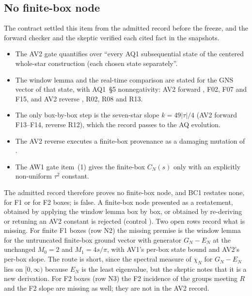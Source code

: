 \subsection{No finite-box node}
\label{sec:bc1-no-node}
The contract settled this item from the admitted record before the freeze,
and the forward checker and the skeptic verified each cited fact in the
snapshots.
\begin{itemize}
\item The AV2 gate quantifies over ``every AQ1 subsequential state of the
 centered whole-star construction (each chosen state separately''.
\item The window lemma and the real-time comparison are stated for the GNS
 vector of that state, with AQ1~\S5 nonnegativity: AV2 forward
 , F02, F07 and F15, and AV2 reverse
 , R02, R08 and R13.
\item The only box-by-box step is the seven-star slope $k=49|\tau|/4$ (AV2
 forward F13--F14, reverse R12), which the record passes to the AQ
 evolution.
\item The AV2 reverse executes a finite-box provenance as a damaging mutation
 of .
\item The AW1 gate item~(1) gives the finite-box $C_N(s)$ only with an
 explicitly non-uniform $\tau^2$ constant.
\end{itemize}
The admitted record therefore proves no finite-box node, and BC1 restates
none, for F1 or for F2 boxes;  is false. A
finite-box node presented as a restatement, obtained by applying the window
lemma box by box, or obtained by re-deriving or retuning an AV2 constant is
rejected (control ). Two open rows
record what is missing. For finite F1 boxes (row N2) the missing premise is
the window lemma for the untruncated finite-box ground vector with generator
$G_N-E_N$ at the unchanged $M_0=2$ and $M_1=4s/\pi$, with AV1's per-box state
bound and AV2's per-box slope. The route is short, since the spectral measure
of $\chi_N$ for $G_N-E_N$ lies on $[0,\infty)$ because $E_N$ is the least
eigenvalue, but the skeptic notes that it is a new derivation. For F2 boxes
(row N3) the F2 incidence of the groups meeting $R$ and the F2 slope are
missing as well; they are not in the AV2 record.

